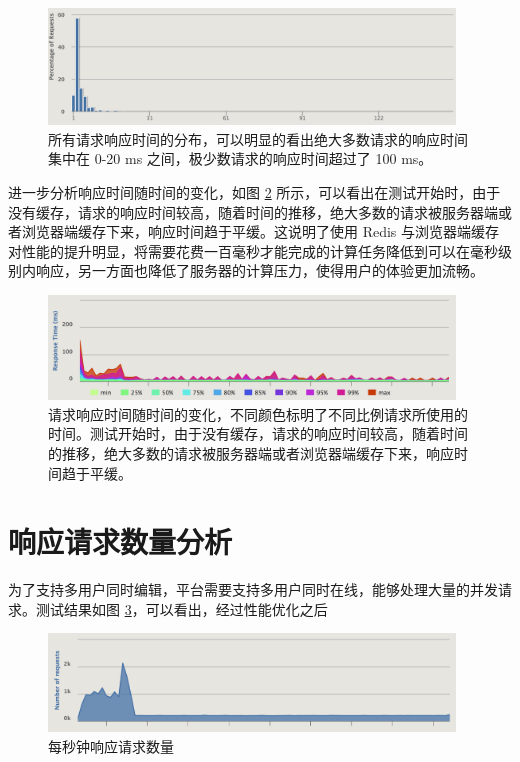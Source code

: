 \begin{figure}
\centering
\includegraphics[width=108mm]{images/responsedis}
\caption{所有请求响应时间的分布，可以明显的看出绝大多数请求的响应时间集中在 0-20 ms 之间，极少数请求的响应时间超过了 100 ms。}
\label{responsedis}
\end{figure}

进一步分析响应时间随时间的变化，如图 \ref{responsetime} 所示，可以看出在测试开始时，由于没有缓存，请求的响应时间较高，随着时间的推移，绝大多数的请求被服务器端或者浏览器端缓存下来，响应时间趋于平缓。这说明了使用 Redis 与浏览器端缓存对性能的提升明显，将需要花费一百毫秒才能完成的计算任务降低到可以在毫秒级别内响应，另一方面也降低了服务器的计算压力，使得用户的体验更加流畅。

\begin{figure}
\centering
\includegraphics[width=108mm]{images/responsetime}
\caption{请求响应时间随时间的变化，不同颜色标明了不同比例请求所使用的时间。测试开始时，由于没有缓存，请求的响应时间较高，随着时间的推移，绝大多数的请求被服务器端或者浏览器端缓存下来，响应时间趋于平缓。}
\label{responsetime}
\end{figure}

\section{响应请求数量分析}
为了支持多用户同时编辑，平台需要支持多用户同时在线，能够处理大量的并发请求。测试结果如图 \ref{requests}，可以看出，经过性能优化之后

\begin{figure}
\centering
\includegraphics[width=108mm]{images/requests}
\caption{每秒钟响应请求数量}
\label{requests}
\end{figure}




